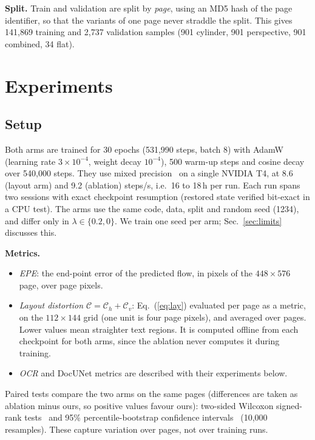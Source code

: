 \documentclass[conference]{IEEEtran}
\newcommand{\Cm}{\mathcal{C}}
\begin{document}
\textbf{Split.} Train and validation are split by \emph{page}, using an MD5 hash of the page identifier, so that the variants of one page never straddle the split. This gives 141{,}869 training and 2{,}737 validation samples (901 cylinder, 901 perspective, 901 combined, 34 flat).

\section{Experiments}
\label{sec:exp}
\subsection{Setup}
Both arms are trained for 30 epochs (531{,}990 steps, batch 8) with AdamW~\cite{loshchilov2019adamw} (learning rate $3\times10^{-4}$, weight decay $10^{-4}$), 500 warm-up steps and cosine decay~\cite{loshchilov2017sgdr} over 540{,}000 steps. They use mixed precision~\cite{micikevicius2018mixed} on a single NVIDIA T4, at 8.6 (layout arm) and 9.2 (ablation) steps/s, i.e.\ 16 to 18\,h per run. Each run spans two sessions with exact checkpoint resumption (restored state verified bit-exact in a CPU test). The arms use the same code, data, split and random seed (1234), and differ only in $\lambda\in\{0.2, 0\}$. We train one seed per arm; Sec.~\ref{sec:limits} discusses this.

\textbf{Metrics.}
\begin{itemize}
\item \emph{EPE}: the end-point error of the predicted flow, in pixels of the $448\times576$ page, over page pixels.
\item \emph{Layout distortion $\Cm = \Cm_h + \Cm_v$}: Eq.~(\ref{eq:lay}) evaluated per page as a metric, on the $112\times144$ grid (one unit is four page pixels), and averaged over pages. Lower values mean straighter text regions. It is computed offline from each checkpoint for both arms, since the ablation never computes it during training.
\item \emph{OCR} and DocUNet metrics are described with their experiments below.
\end{itemize}
Paired tests compare the two arms on the same pages (differences are taken as ablation minus ours, so positive values favour ours): two-sided Wilcoxon signed-rank tests~\cite{wilcoxon1945individual} and 95\% percentile-bootstrap confidence intervals~\cite{efron1993bootstrap} (10{,}000 resamples). These capture variation over pages, not over training runs.
\end{document}
